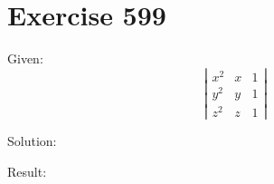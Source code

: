 \documentclass[a4paper, 10pt]{scrartcl}
\begin{document}
\section{Exercise 599}

Given:
\[
\left|
    \begin{array}{ccc}
        x^{2} & x & 1\\
        y^{2} & y & 1\\
        z^{2} & z & 1
    \end{array}
\right|
\]

Solution:

Result:
\end{document}
